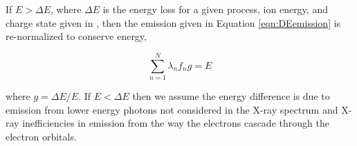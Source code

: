 \documentclass[draft]{agujournal2018}
\begin{document}
If $E>\Delta E$, where $\Delta E$ is the energy loss for a given process, ion energy, and charge state given in \citet{schultz2018}, then the emission given in Equation \ref{eqn:DEemission} is re-normalized to conserve energy,

\begin{equation}
    \sum_{n=1}^{N}\lambda_{n}f_{n}g=E
\end{equation}

\noindent where $g=\Delta E/E$.
If $E<\Delta E$ then we assume the energy difference is due to emission from lower energy photons not considered in the X-ray spectrum and X-ray inefficiencies in emission from the way the electrons cascade through the electron orbitals.




%
%
%
%
%
%
%
%
%
%
\end{document}
